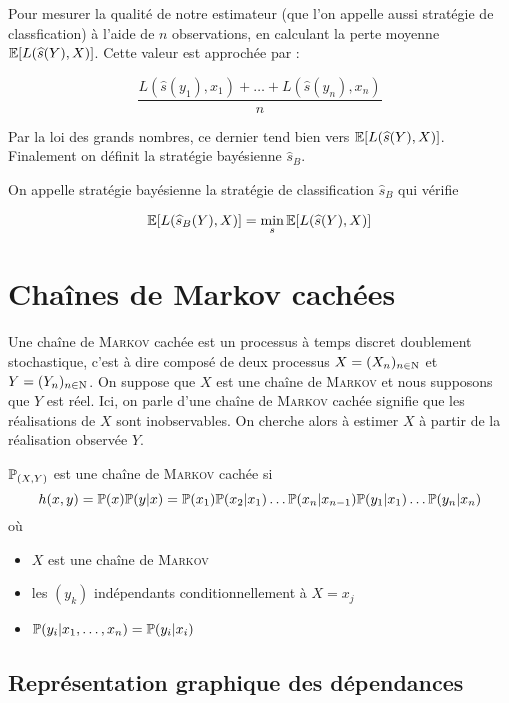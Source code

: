 Pour mesurer la qualité de notre estimateur (que l'on appelle aussi stratégie de classfication) à l'aide de $n$ observations, en calculant la perte moyenne $\E[L(\widehat{s}(Y), X)]$. Cette valeur est approchée par :

\[ \frac{L(\widehat{s}(y_1),x_1) + \ldots +L(\widehat{s}(y_n),x_n) }{n} \]

Par la loi des grands nombres, ce dernier tend bien vers $\E[L(\widehat{s}(Y), X)]$. Finalement on définit la stratégie bayésienne $\widehat{s}_B$.

\begin{definition}
  On appelle stratégie bayésienne la stratégie de classification $\widehat{s}_B$ qui vérifie 

  \[ \E[ L( \widehat{s}_B(Y), X) ] = \min_s \E[ L( \widehat{s}(Y), X) ] \]
\end{definition}

\section{Chaînes de Markov cachées}

Une chaîne de \textsc{Markov} cachée est un processus à temps discret doublement stochastique, c'est à dire composé de deux processus $X = (X_n)_{n \in \N}$ et $Y = (Y_n)_{n \in \N}$. On suppose que $X$ est une chaîne de \textsc{Markov} et nous supposons que $Y$ est réel. Ici, on parle d'une chaîne de \textsc{Markov} \og cachée \fg{} signifie que les réalisations de $X$ sont inobservables. On cherche alors à estimer $X$ à partir de la réalisation observée $Y$.

\begin{definition}
  $\P_{(X,Y)}$ est une chaîne de \textsc{Markov} cachée si 
  \[ h(x,y) = \P(x)\P(y \vert x) = \P(x_1)\P(x_2 \vert x_1) \ldots \P(x_n \vert x_{n-1}) \P(y_1 \vert x_1) \ldots \P(y_n \vert x_n) \]
  où 
  \begin{itemize}
    \item $X$ est une chaîne de \textsc{Markov}
    \item les $(y_k)$ indépendants conditionnellement à $X = x_j$
    \item $\P(y_i \vert x_1,\ldots,x_n) = \P(y_i \vert x_i)$
  \end{itemize}
\end{definition}

\subsection{Représentation graphique des dépendances}

